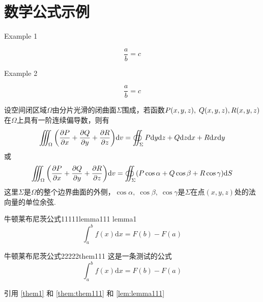 \documentclass[12pt, a4paper, oneside, UTF8]{ctexbook}
\begin{document}

\else
\fi

\chapter{数学公式示例}

Example 1

\[
    \frac{a}{b} = c
\]

Example 2

\[
    \frac{a}{b} = c
\]

\begin{defn}{}{}  %
    设空间闭区域$\Omega$由分片光滑的闭曲面$\Sigma$围成，若函数$P(x,y,z),\;Q(x,y,z) \\ ,R(x,y,z)$在$\Omega$上具有一阶连续偏导数，则有
    \begin{equation}
        \iiint_{\Omega} \bigg(\frac{\partial P}{\partial x}+\frac{\partial Q}{\partial y}+\frac{\partial R}{\partial z} \bigg)\textup{d} v = \oiint_{\Sigma}P\textup{d} y\textup{d} z+Q\textup{d} z\textup{d} x+R\textup{d} x\textup{d} y
    \end{equation}
    或
    \begin{equation}
        \iiint_{\Omega} \bigg(\frac{\partial P}{\partial x}+\frac{\partial Q}{\partial y}+\frac{\partial R}{\partial z} \bigg)\textup{d} v = \oiint_{\Sigma}(P\cos\alpha+Q\cos\beta+R\cos\gamma)\textup{d} S
    \end{equation}
    这里$\Sigma$是$\Omega$的整个边界曲面的外侧，$\cos\alpha,\;\cos\beta,\;\cos\gamma$是$\Sigma$在点$(x,y,z)$处的法向量的单位余弦.
\end{defn}

\begin{lemma}{牛顿莱布尼茨公式11111}{lemma111}
    lemma1
    \[
        \int_a^b f(x) \mathrm{d}x = F(b) -F(a)
    \]
\end{lemma}

\begin{them}[label=them1]{牛顿莱布尼茨公式22222}{them111}  %
    这是一条测试的公式
    \[
        \int_a^b f(x) \mathrm{d}x = F(b) -F(a)
    \]
\end{them}

引用 \ref{them1}  和 \ref{them:them111}  和 \ref{lem:lemma111}

\ifx\allfiles\undefined
\end{document}
